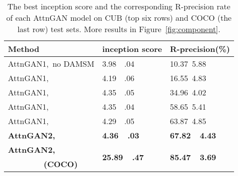 \documentclass[10pt,twocolumn,letterpaper]{article}
\begin{document}
\begin{table}[bt]
  \begin{center}
    \small
\begin{tabular}{l|l|l}
Method & inception score & R-precision(\%)\\
    \hline
     AttnGAN1,~no DAMSM       &3.98~~.04  & 10.37~5.88 \\
AttnGAN1,~  &4.19~~.06  & 16.55~4.83\\
     AttnGAN1,~    &4.35~~.05  & 34.96~4.02  \\
     AttnGAN1,~    &4.35~~.04  & 58.65~5.41  \\
     AttnGAN1,~   &4.29~~.05  & 63.87~4.85  \\
    \hline
     \textbf{AttnGAN2,~} &\textbf{4.36~~.03}   & \textbf{67.82~~4.43}  \\
     \hline
      \textbf{AttnGAN2,~} &\multirow{2}{4em}{\textbf{25.89~~.47}}   & \multirow{2}{4em}{\textbf{85.47~~3.69}} \\
      ~~~~~~~~~\textbf{(COCO)} & & \\  
    \hline
   \end{tabular}
  \end{center}
\caption{The best inception score and the corresponding R-precision rate of each AttnGAN model on CUB (top six rows) and COCO (the last row) test sets. More results in Figure~\ref{fig:component}.}
    \vspace{-10pt}
  \label{tab:component} 
 \end{table}
\end{document}
